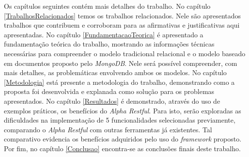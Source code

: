Os capítulos seguintes contém mais detalhes do trabalho. No capítulo \ref{TrabalhosRelacionados} temos os trabalhos relacionados. Nele são apresentados trabalhos que contribuem e corroboram para as afirmativas e justificativas aqui apresentadas. No capítulo \ref{FundamentacaoTeorica} é apresentado a fundamentação teórica do trabalho, mostrando as informações técnicas necessárias para compreender o modelo tradicional relacional e o modelo baseado em documentos proposto pelo \textit{MongoDB}. Nele será possível compreender, com mais detalhes, as problemáticas envolvendo ambos os modelos. No capítulo \ref{Metodologia} está presente a metodologia do trabalho, demonstrando como a proposta foi desenvolvida e explanada como solução para os problemas apresentados. No capítulo \ref{Resultados} é demonstrado, através do uso de exemplos práticos, os benefícios do \textit{Alpha Restful}. Para isto, serão exploradas as dificuldades na implementação de 5 funcionalidades selecionadas previamente, comparando o \textit{Alpha Restful} com outras ferramentas já existentes. Tal comparativo evidencia os benefícios adquiridos pelo uso do \textit{framework} proposto. Por fim, no capítulo \ref{Conclusao} encontra-se as conclusões finais deste trabalho.




